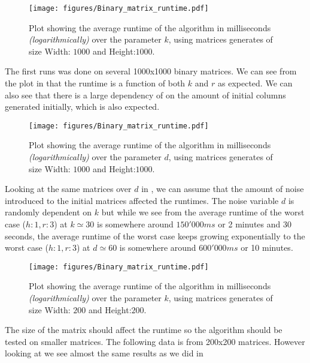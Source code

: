 \documentclass[a4paper]{article}
\begin{document}
\begin{figure}[H]
    \centering
    \texttt{[image: figures/Binary\_matrix\_runtime.pdf]}
    \caption{Plot showing the average runtime of the algorithm in milliseconds \textit{(logarithmically)}
        over the parameter $k$, using matrices generates of size Width: $1000$ and Height:$1000$.}
    \label{fig:res-1000x1000k}
\end{figure}

The first runs was done on several 1000x1000 binary matrices. We can see from the plot in 
that the runtime is a function of both $k$ and $r$ as expected. We can also see that there is a large dependency of
on the amount of initial columns generated initially, which is also expected.

\begin{figure}[!ht]
    \centering
    \texttt{[image: figures/Binary\_matrix\_runtime.pdf]}
    \caption{Plot showing the average runtime of the algorithm in milliseconds \textit{(logarithmically)}
        over the parameter $d$, using matrices generates of size Width: $1000$ and Height:$1000$.}
    \label{fig:res-1000x1000d}
\end{figure}

Looking at the same matrices over $d$ in , we can assume that the amount of noise
introduced to the initial matrices affected the runtimes. The noise variable $d$ is randomly dependent on $k$
but while we see from  the average runtime of the worst case ($h:1,r:3$) at $k \simeq 30$
is somewhere around $150'000ms$ or 2 minutes and 30 seconds, the average runtime of the worst case keeps growing exponentially
to the worst case ($h:1,r:3$) at $d \simeq 60$ is somewhere around $600'000ms$ or 10 minutes.

\begin{figure}[!ht]
    \centering
    \texttt{[image: figures/Binary\_matrix\_runtime.pdf]}
    \caption{Plot showing the average runtime of the algorithm in milliseconds \textit{(logarithmically)}
        over the parameter $k$, using matrices generates of size Width: $200$ and Height:$200$.}
    \label{fig:res-200x200k}
\end{figure}

The size of the matrix should affect the runtime so the algorithm should be tested on smaller matrices. The
following data is from 200x200 matrices. However looking at  we see almost the same
results as we did in 
\end{document}
